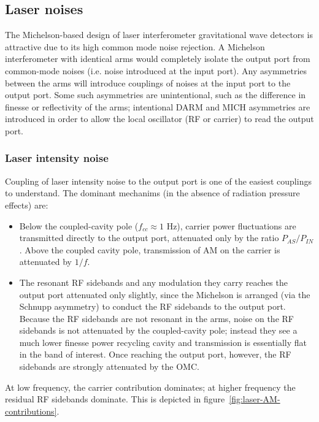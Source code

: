 \subsection{Laser noises}

The Michelson-based design of laser interferometer gravitational wave detectors
is attractive due to its high common mode noise rejection.  A Michelson
interferometer with identical arms would completely isolate the output port from
common-mode noises (i.e. noise introduced at the input port).  Any asymmetries
between the arms will introduce couplings of noises at the input port to the
output port.  Some such asymmetries are unintentional, such as the difference in
finesse or reflectivity of the arms; intentional DARM and MICH asymmetries are
introduced in order to allow the local oscillator (RF or carrier) to read the
output port.

\subsubsection{Laser intensity noise}

Coupling of laser intensity noise to the output port is one of the easiest
couplings to understand.  The dominant mechanims (in the absence of radiation
pressure effects) are:
%
\begin{itemize}
\item Below the coupled-cavity pole ($f_{cc}\approx 1$ Hz), carrier power
  fluctuations are transmitted directly to the output port, attenuated only by
  the ratio $P_{AS}/P_{IN}$.  Above the coupled cavity pole, transmission of AM
  on the carrier is attenuated by $1/f$.
\item The resonant RF sidebands and any modulation they carry reaches the output
  port attenuated only slightly, since the Michelson is arranged (via the
  Schnupp asymmetry) to conduct the RF sidebands to the output port.  Because
  the RF sidebands are not resonant in the arms, noise on the RF sidebands is
  not attenuated by the coupled-cavity pole; instead they see a much lower
  finesse power recycling cavity and transmission is essentially flat in the
  band of interest.  Once reaching the output port, however, the RF sidebands
  are strongly attenuated by the OMC.
\end{itemize}
At low frequency, the carrier contribution dominates; at higher
frequency the residual RF sidebands dominate.  This is depicted in
figure~\ref{fig:laser-AM-contributions}.

